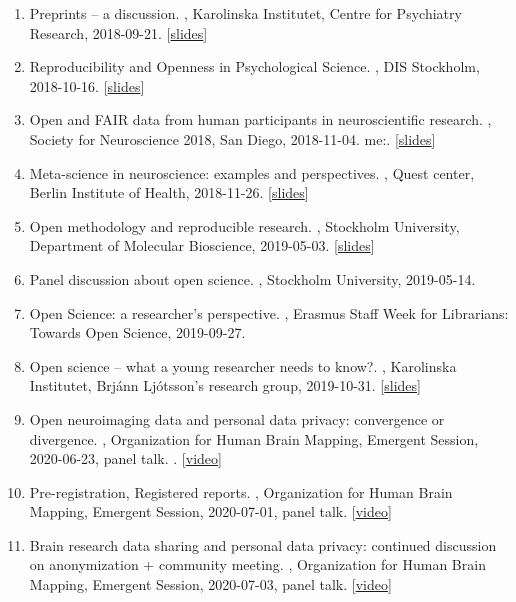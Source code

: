 \documentclass[10pt,a4paper,twocolumn]{article}
\begin{document}
\begin{enumerate}
    \item Preprints – a discussion. , Karolinska Institutet, Centre for Psychiatry Research, 2018-09-21. [\href{https://osf.io/wfctz/}{slides}]

    \item Reproducibility and Openness in Psychological Science. , DIS Stockholm, 2018-10-16. [\href{https://osf.io/yre8g/}{slides}]

    \item Open and FAIR data from human participants in neuroscientific research. , Society for Neuroscience 2018, San Diego, 2018-11-04. me:. [\href{https://osf.io/8jbqh/}{slides}]

    \item Meta-science in neuroscience: examples and perspectives. , Quest center, Berlin Institute of Health, 2018-11-26. [\href{https://osf.io/f6hjs/}{slides}]

    \item Open methodology and reproducible research. , Stockholm University, Department of Molecular Bioscience, 2019-05-03. [\href{https://osf.io/ah6sy/}{slides}]

    \item Panel discussion about open science. , Stockholm University, 2019-05-14.

    \item Open Science: a researcher’s perspective. , Erasmus Staff Week for Librarians: Towards Open Science, 2019-09-27.

    \item Open science – what a young researcher needs to know?. , Karolinska Institutet, Brjánn Ljótsson's research group, 2019-10-31. [\href{https://osf.io/xbcde/}{slides}]

    \item Open neuroimaging data and personal data privacy: convergence or divergence. , Organization for Human Brain Mapping, Emergent Session, 2020-06-23, panel talk. . [\href{https://www.youtube.com/watch?v=A3BapxKPnRQ&list=PLVso6Qs8PLChTc8uMUWNSe_Bj4tfOHC_f&index=27}{video}]

    \item Pre-registration, Registered reports. , Organization for Human Brain Mapping, Emergent Session, 2020-07-01, panel talk. [\href{https://www.youtube.com/watch?v=-GKKiwMyfH8&list=PLVso6Qs8PLChTc8uMUWNSe_Bj4tfOHC_f&index=15}{video}]

    \item Brain research data sharing and personal data privacy: continued discussion on anonymization + community meeting. , Organization for Human Brain Mapping, Emergent Session, 2020-07-03, panel talk. [\href{https://www.youtube.com/watch?v=j9wFwBxwMvI&list=PLVso6Qs8PLChTc8uMUWNSe_Bj4tfOHC_f&index=16}{video}]


\end{enumerate}
\end{document}
